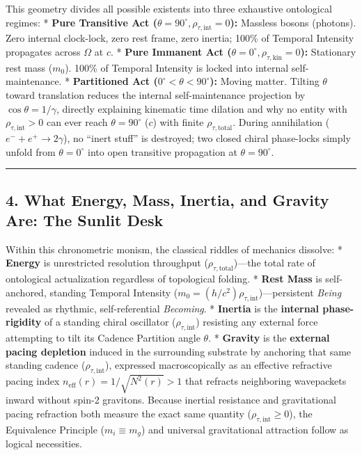 \documentclass[
]{article}
\begin{document}
This geometry divides all possible existents into three exhaustive
ontological regimes: * \textbf{Pure Transitive Act
(\(\theta = 90^\circ, \rho_{\tau,\text{int}} = 0\)):} Massless bosons
(photons). Zero internal clock-lock, zero rest frame, zero inertia;
100\% of Temporal Intensity propagates across \(\Omega\) at \(c\). *
\textbf{Pure Immanent Act
(\(\theta = 0^\circ, \rho_{\tau,\text{kin}} = 0\)):} Stationary rest
mass (\(m_0\)). 100\% of Temporal Intensity is locked into internal
self-maintenance. * \textbf{Partitioned Act
(\(0^\circ < \theta < 90^\circ\)):} Moving matter. Tilting \(\theta\)
toward translation reduces the internal self-maintenance projection by
\(\cos\theta = 1/\gamma\), directly explaining kinematic time dilation
and why no entity with \(\rho_{\tau,\text{int}} > 0\) can ever reach
\(\theta = 90^\circ\) (\(c\)) with finite \(\rho_{\tau,\text{total}}\).
During annihilation (\(e^- + e^+ \to 2\gamma\)), no ``inert stuff'' is
destroyed; two closed chiral phase-locks simply unfold from
\(\theta = 0^\circ\) into open transitive propagation at
\(\theta = 90^\circ\).

\begin{center}\rule{0.5\linewidth}{0.5pt}\end{center}

\subsection{4. What Energy, Mass, Inertia, and Gravity Are: The Sunlit
Desk}\label{what-energy-mass-inertia-and-gravity-are-the-sunlit-desk}

Within this chronometric monism, the classical riddles of mechanics
dissolve: * \textbf{Energy} is unrestricted resolution throughput
(\(\rho_{\tau,\text{total}}\))---the total rate of ontological
actualization regardless of topological folding. * \textbf{Rest Mass} is
self-anchored, standing Temporal Intensity
(\(m_0 = (h/c^2)\rho_{\tau,\text{int}}\))---persistent \emph{Being}
revealed as rhythmic, self-referential \emph{Becoming}. *
\textbf{Inertia} is the \textbf{internal phase-rigidity} of a standing
chiral oscillator (\(\rho_{\tau,\text{int}}\)) resisting any external
force attempting to tilt its Cadence Partition angle \(\theta\). *
\textbf{Gravity} is the \textbf{external pacing depletion} induced in
the surrounding substrate by anchoring that same standing cadence
(\(\rho_{\tau,\text{int}}\)), expressed macroscopically as an effective
refractive pacing index \(n_{\text{eff}}(r) = 1/\sqrt{N^2(r)} > 1\) that
refracts neighboring wavepackets inward without spin-2 gravitons.
Because inertial resistance and gravitational pacing refraction both
measure the exact same quantity (\(\rho_{\tau,\text{int}} \ge 0\)), the
Equivalence Principle (\(m_i \equiv m_g\)) and universal gravitational
attraction follow as logical necessities.
\end{document}
